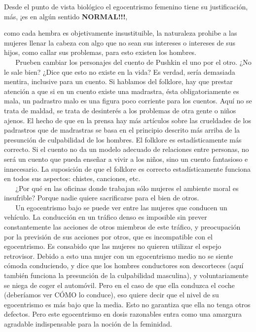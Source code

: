 \begin{tcolorbox}
 Desde el punto de vista biológico el egocentrismo femenino tiene su
justificación, más, ¡es en algún sentido
\textbf{\mbox NORMAL!!!},
\end{tcolorbox}



como cada hembra es objetivamente insustituible, la naturaleza prohibe a
las mujeres llenar la cabeza con algo que no sean sus intereses o
intereses de sus hijos, como callar sus problemas, para esto existen los
hombres.\\
\hspace*{0.333em} ~ ~ Prueben cambiar los personajes del cuento de
Pushkin el uno por el otro. ¿No le sale bien? ¿Dice que esto no existe
en la vida? Es verdad, sería demasiada mentira, inclusive para un
cuento. Si hablamos del folklore, hay que prestar atención a que si en
un cuento existe una madrastra, ésta obligatoriamente es mala, un
padrastro malo es una figura poco corriente para los cuentos. Aquí no se
trata de maldad, se trata de desinterés a los problemas de otra gente o
niños ajenos. El hecho de que en la prensa hay más artículos sobre las
crueldades de los padrastros que de madrastras se basa en el principio
descrito más arriba de la presunción de culpabilidad de los hombres. El
folklore es estadísticamente más correcto. Si el cuento no da un modelo
adecuado de relaciones entre personas, no será un cuento que pueda
enseñar a vivir a los niños, sino un cuento fantasioso e innecesario. La
suposición de que el folklore es correcto estadísticamente funciona en
todos sus aspectos: chistes, canciones, etc.\\
\hspace*{0.333em} ~ ~ ¿Por qué en las oficinas donde trabajan sólo
mujeres el ambiente moral es insufrible? Porque nadie quiere
sacrificarse para el bien de otros.\\
\hspace*{0.333em} ~ ~ Un egocentrismo bajo se puede ver entre las
mujeres que conducen un vehículo. La conducción en un tráfico denso es
imposible sin prever constantemente las acciones de otros miembros de
este tráfico, y preocupación por la previsión de sus acciones por otros,
que es incompatible con el egocentrismo. Es consabido que las mujeres no
quieren utilizar el espejo retrovisor. Debido a esto una mujer con un
egocentrismo medio no se siente cómoda conduciendo, y dice que los
hombres conductores son descorteces (aquí también funciona la presunción
de la culpabilidad masculina), y voluntariamente se niega de coger el
automóvil. Pero en el caso de que ella conduzca el coche (deberíamos ver
CÓMO lo conduce), eso quiere decir que el nivel de su egocentrismo es
más bajo que la media. Esto no garantiza que ella no tenga otros
defectos. Pero este egocentrismo en dosis razonables entra como una
amargura agradable indispensable para la noción de la feminidad.

